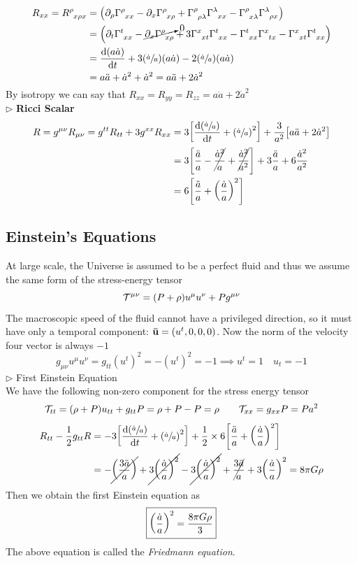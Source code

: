 \begin{align*}
    R_{xx} = \rie{\rho}{x}{\rho}{x} &= \qty(\partial_\rho \chris{\rho}{x}{x}-\partial_x \chris{\rho}{x}{\rho} + \chris{\rho}{\rho}{\lambda}\chris{\lambda}{x}{x}-\chris{\rho}{x}{\lambda}\chris{\lambda}{\rho}{x})\\
    &=\qty(\partial_t \chris{t}{x}{x}-\cancelto{0}{\partial_x \chris{\rho}{x}{\rho}} + 3\chris{x}{x}{t}\chris{t}{x}{x}-\chris{t}{x}{x}\chris{x}{t}{x}-\chris{x}{x}{t}\chris{t}{x}{x})\\
    &=\dv{(a\dot{a})}{t} + 3\qty(\sfrac{\dot{a}}{a})(a\dot{a} ) -2\qty(\sfrac{\dot{a}}{a})(a\dot{a} ) \\
    &=a\ddot{a} + \dot{a}^2 +\dot{a}^2 =  a\ddot{a}  +2\dot{a}^2 
\end{align*}
By isotropy we can say that $R_{xx}= R_{yy}=R_{zz} =a\ddot{a} + 2\dot{a}^2$\\[0.2cm]
$\triangleright$ \textbf{Ricci Scalar}
\begin{align*}
    R = g^{\mu\nu}R_{\mu\nu} = g^{tt}R_{tt}+3g^{xx}R_{xx} &= 3\qty[  \dv{\qty(\sfrac{\dot{a}}{a})}{t} + \qty(\sfrac{\dot{a}}{a})^2] +\frac{3}{a^2}\qty[a\ddot{a} + 2\dot{a}^2]\\
    &=3\qty[\frac{\ddot{a}}{a} - \cancel{\frac{\dot{a}^2}{a}} + \cancel{\frac{\dot{a}^2}{a^2} }] + 3\frac{\ddot{a}}{a} + 6\frac{\dot{a}^2}{a^2}\\
    &=6\qty[\frac{\ddot{a}}{a}+\qty(\frac{\dot{a}}{a})^2]
\end{align*}
\subsection{Einstein's Equations}
At large scale, the Universe is assumed to be a perfect fluid and thus we assume the same form of the stress-energy tensor 
$$\mathcal T^{\mu\nu} = (P+\rho)u^\mu u^\nu + Pg^{\mu\nu}$$
The macroscopic speed of the fluid cannot have a privileged direction, so it must have only a temporal component: $\vb{\bar{u}} = (u^t,0,0,0)$. Now the norm of the velocity four vector is always $-1$
$$g_{\mu\nu}u^\mu u^\nu = g_{tt}(u^t)^2 = -(u^t)^2 = -1 \implies u^t=1 \quad u_t = -1$$
$\triangleright$ First Einstein Equation \\[0.2cm]
We have the following non-zero component for the stress energy tensor 
$$\mathcal T_{tt} = (\rho+P)u_{tt} + g_{tt}P = \rho+P -P =\rho\qquad \mathcal T_{xx} = g_{xx}P = Pa^2$$
\begin{align*}
    R_{tt} - \frac{1}{2}g_{tt}R &= -3\qty[  \dv{\qty(\sfrac{\dot{a}}{a})}{t} + \qty(\sfrac{\dot{a}}{a})^2] +\frac{1}{2}\times 6\qty[\frac{\ddot{a}}{a}+\qty(\frac{\dot{a}}{a})^2]\\
    &=-\cancel{\qty(\frac{3\ddot{a}}{a})} +\cancel{3\qty(\frac{\dot{a}}{a})^2 }- \cancel{3\qty(\frac{\dot{a}}{a})^2} + \cancel{\frac{3\ddot{a}}{a}} + 3\qty(\frac{\dot{a}}{a})^2 = 8 \pi G \rho
\end{align*}
Then we obtain the first Einstein equation as 
\begin{align}\label{eqn:friedmann}
    \boxed{\qty(\frac{\dot{a}}{a})^2  = \frac{8\pi G \rho}{3}}
\end{align}
The above equation is called the \textit{Friedmann equation}.